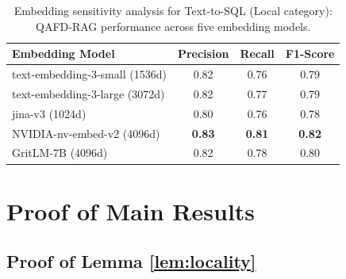 \documentclass{article} %
\begin{document}
\begin{table}[t]
\centering

\caption{{Embedding sensitivity analysis for Text-to-SQL (Local category): QAFD-RAG performance across five embedding models.}}
\label{tab:embedding_text2sql_local}
{
\begin{tabular}{lccc}
\toprule
\textbf{Embedding Model} &
\textbf{Precision} &
\textbf{Recall} &
\textbf{F1-Score} \\
\midrule
text-embedding-3-small (1536d) &
0.82 &
0.76 &
0.79 \\
text-embedding-3-large (3072d) &
0.82 &
0.77 &
0.79 \\
jina-v3 (1024d) &
0.80 &
0.76 &
0.78 \\
NVIDIA-nv-embed-v2 (4096d) &
\textbf{0.83} &
\textbf{0.81} &
\textbf{0.82} \\
GritLM-7B (4096d) &
0.82 &
0.78 &
0.80 \\ 
\bottomrule
\end{tabular}
}
\end{table}

\section{Proof of Main Results}\label{sec:app:proofs}

\subsection{Proof of Lemma \ref{lem:locality}}
\end{document}
